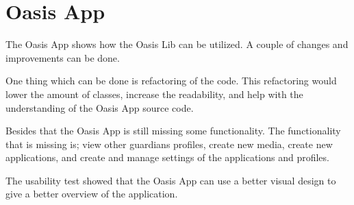 \section{Oasis App}
The Oasis App shows how the Oasis Lib can be utilized.
A couple of changes and improvements can be done.

One thing which can be done is refactoring of the code.
This refactoring would lower the amount of classes, increase the readability, and help with the understanding of the Oasis App source code.

Besides that the Oasis App is still missing some functionality.
The functionality that is missing is; view other guardians profiles, create new media, create new applications, and create and manage settings of the applications and profiles.

The usability test showed that the Oasis App can use a better visual design to give a better overview of the application.